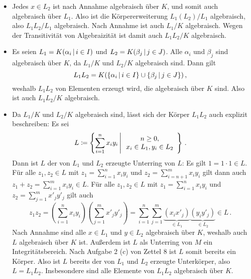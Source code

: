 \begin{itemize}
  \item
    Jedes $x \in L_2$ ist nach Annahme algebraisch über $K$, und somit auch algebraisch über $L_1$.
    Also ist die Körpererweiterung $L_1(L_2)/L_1$ algebraisch, also $L_1 L_2 / L_1$ algebraisch.
    Nach Annahme ist auch $L_1/K$ algebraisch.
    Wegen der Transitivität von Algebraizität ist damit auch $L_1 L_2 / K$ algebraisch.
  \item
    Es seien $L_1 = K(\alpha_i \suchthat i \in I)$ und $L_2 = K(\beta_j \suchthat j \in J)$.
    Alle $\alpha_i$ und $\beta_j$ sind algebraisch über $K$, da $L_1/K$ und $L_2/K$ algebraisch sind.
    Dann gilt
    \[
        L_1 L_2
      = K(\{\alpha_i \suchthat i \in I\} \cup \{\beta_j \suchthat j \in J\}) \,,
    \]
    weshalb $L_1 L_2$ von Elementen erzeugt wird, die algebraisch über $K$ sind.
    Also ist auch $L_1 L_2 / K$ algebraisch.
  \item
    Da $L_1/K$ und $L_2/K$ algebraisch sind, lässt sich der Körper $L_1 L_2$ auch explizit beschreiben:
    Es sei
    \[
              L
      \define \left\{
                \sum_{i=1}^n x_i y_i
              \suchthat*
                \begin{array}{c}
                  n \geq 0,
                \\
                  x_i \in L_1,
                  y_i \in L_2
                \end{array}
              \right\} \,.
    \]
    Dann ist $L$ der von $L_1$ und $L_2$ erzeugte Unterring von $L$:
    Es gilt $1 = 1 \cdot 1 \in L$.
    Für alle $z_1, z_2 \in L$ mit $z_1 = \sum_{i=1}^n x_i y_i$ und $z_2 = \sum_{i=n+1}^m x_i y_i$ gilt dann auch $z_1 + z_2 = \sum_{i=1}^m x_i y_i \in L$.
    Für alle $z_1, z_2 \in L$ mit $z_1 = \sum_{i=1}^n x_i y_i$ und $z_2 = \sum_{j=1}^m x'_j y'_j$ gilt auch
    \[
          z_1 z_2
      =   \left(
            \sum_{i=1}^n x_i y_i
          \right)
          \left(
            \sum_{j=1}^m x'_j y'_j
          \right)
      =   \sum_{i=1}^n \sum_{j=1}^m \underbrace{(x_i x'_j)}_{\in L_1} \underbrace{(y_i y'_j)}_{\in L_2}
      \in L \,.
    \]
    Nach Annahme sind alle $x \in L_1$ und $y \in L_2$ algebraisch über $K$, weshalb auch $L$ algebraisch über $K$ ist.
    Außerdem ist $L$ als Unterring von $M$ ein Integritätsbereich.
    Nach Aufgabe 2 (c) von Zettel 8 ist $L$ somit bereits ein Körper.
    Also ist $L$ bereits der von $L_1$ und $L_2$ erzeugte Unterkörper, also $L = L_1 L_2$.
    Insbesondere sind alle Elemente von $L_1 L_2$ algebraisch über $K$.
    

\end{itemize}
